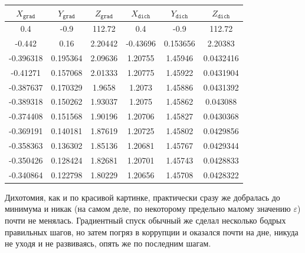 \documentclass[12pt, a4paper, oneside, final]{article}
\begin{document}
	\begin{table}[H]
		\centering
		\begin{tabular}{|c|c|c|c|c|c|}
			$X_{\texttt{grad}}$ & $Y_{\texttt{grad}}$ & $Z_{\texttt{grad}}$ & $X_{\texttt{dich}}$ & $Y_{\texttt{dich}}$ & $Z_{\texttt{dich}}$ \\ \hline
			0.4&-0.9&112.72&0.4&-0.9&112.72 \\
			-0.442&0.16&2.20442&-0.43696&0.153656&2.20383 \\
			-0.396318&0.195364&2.09636&1.20755&1.45946&0.0432416 \\
			-0.41271&0.157068&2.01333&1.20775&1.45922&0.0431904 \\
			-0.387637&0.170329&1.9658&1.2073&1.45886&0.0431392 \\
			-0.389318&0.150262&1.93037&1.2075&1.45862&0.043088 \\
			-0.374408&0.151568&1.90196&1.20706&1.45827&0.0430368 \\
			-0.369191&0.140181&1.87619&1.20725&1.45802&0.0429856 \\
			-0.358363&0.136302&1.85136&1.20681&1.45767&0.0429344 \\
			-0.350426&0.128424&1.82681&1.20701&1.45743&0.0428833 \\
			-0.340864&0.122798&1.80229&1.20656&1.45708&0.0428322
		\end{tabular}
	\end{table}
	Дихотомия, как и по красивой картинке, практически сразу же добралась до минимума и никак (на самом деле, по некоторому предельно малому значению $\varepsilon$) почти не менялась. Градиентный спуск обычный же сделал несколько бодрых правильных шагов, но затем погряз в коррупции и оказался почти на дне, никуда не уходя и не развиваясь, опять же по последним шагам.
\end{document}
